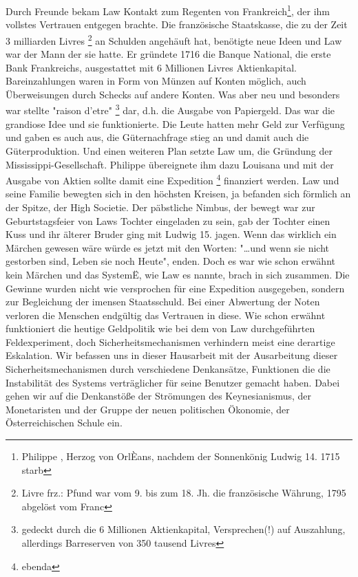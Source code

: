 \documentclass[
        onecolumn,
        a4paper,
        abstracton,
        parskip=half
        ,final
        ]{scrartcl}
\begin{document}
    Durch Freunde bekam Law Kontakt zum Regenten von Frankreich\footnote[6]{Philippe , Herzog von OrlÈans, nachdem der Sonnenk{\"o}nig Ludwig 14. 1715 starb}, der ihm vollstes Vertrauen entgegen brachte. Die franz{\"o}sische Staatskasse, die zu der Zeit 3 milliarden Livres \footnote[7]{Livre frz.: Pfund war vom 9. bis zum 18. Jh. die franz{\"o}sische W{\"a}hrung, 1795 abgel{\"o}st vom Franc} an Schulden angeh{\"a}uft hat, ben{\"o}tigte neue Ideen und Law war der Mann der sie hatte. Er gr{\"u}ndete 1716 die Banque National, die erste Bank Frankreichs, ausgestattet mit 6 Millionen Livres Aktienkapital. Bareinzahlungen waren in Form von M{\"u}nzen auf Konten m{\"o}glich, auch {\"U}berweisungen durch Schecks auf andere Konten. Was aber neu und besonders war stellte "raison d'etre" \footnote[8]{gedeckt durch die 6 Millionen Aktienkapital, Versprechen(!) auf Auszahlung, allerdings Barreserven von 350 tausend Livres} dar, d.h. die Ausgabe von Papiergeld. Das war die grandiose Idee und sie funktionierte. Die Leute hatten mehr Geld zur Verf{\"u}gung und gaben es auch aus, die G{\"u}ternachfrage stieg an und damit auch die G{\"u}terproduktion. Und einen weiteren Plan setzte Law um, die Gr{\"u}ndung der Mississippi-Gesellschaft. Philippe {\"u}bereignete ihm dazu Louisana und mit der Ausgabe von Aktien sollte damit eine Expedition \footnote[9]{ebenda} finanziert werden. Law und seine Familie bewegten sich in den h{\"o}chsten Kreisen, ja befanden sich f{\"o}rmlich an der Spitze, der High Societie. Der p{\"a}bstliche Nimbus, der bewegt war zur Geburtstagsfeier von Laws Tochter eingeladen zu sein, gab der Tochter einen Kuss und ihr {\"a}lterer Bruder ging mit Ludwig 15. jagen. Wenn das wirklich ein M{\"a}rchen gewesen w{\"a}re w{\"u}rde es jetzt mit den Worten: "\ldots und wenn sie nicht gestorben sind, Leben sie noch Heute", enden. Doch es war wie schon erw{\"a}hnt kein M{\"a}rchen und das SystemË, wie Law es nannte, brach in sich zusammen. Die Gewinne wurden nicht wie versprochen f{\"u}r eine Expedition ausgegeben, sondern zur Begleichung der imensen Staatsschuld. Bei einer Abwertung der Noten verloren die Menschen endg{\"u}ltig das Vertrauen in diese.
    Wie schon erw{\"a}hnt funktioniert die heutige Geldpolitik wie bei dem von Law durchgef{\"u}hrten Feldexperiment, doch Sicherheitsmechanismen verhindern meist eine derartige Eskalation.
    Wir befassen uns in dieser Hausarbeit mit der Ausarbeitung dieser Sicherheitsmechanismen durch verschiedene Denkans{\"a}tze, Funktionen die die Instabilit{\"a}t des Systems vertr{\"a}glicher f{\"u}r seine Benutzer gemacht haben. Dabei gehen wir auf die Denkanst{\"o}{\ss}e der Str{\"o}mungen des Keynesianismus, der Monetaristen und der Gruppe der neuen politischen  {\"O}konomie, der {\"O}sterreichischen Schule ein.
\end{document}
